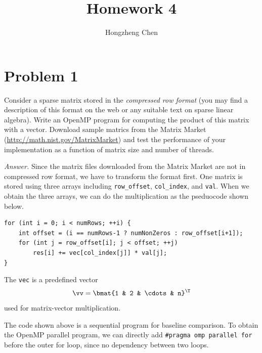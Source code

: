 \documentclass[english]{thesis}
\title{Homework 4}
\author{Hongzheng Chen}
\begin{document}
\maketitle

\section{Problem 1}
Consider a sparse matrix stored in the \emph{compressed row format} (you may find a description of this format on the web or any suitable text on sparse linear algebra). Write an OpenMP program for computing the product of this matrix with a vector. Download sample matrics from the Matrix Market (\url{http://math.nist.gov/MatrixMarket}) and test the performance of your implementation as a function of matrix size and number of threads.

\bigskip

\textit{Answer.}
Since the matrix files downloaded from the Matrix Market are not in compressed row format, we have to transform the format first.
One matrix is stored using three arrays including \verb'row_offset', \verb'col_index', and \verb'val'.
When we obtain the three arrays, we can do the multiplication as the pseduocode shown below.
\begin{lstlisting}
for (int i = 0; i < numRows; ++i) {
	int offset = (i == numRows-1 ? numNonZeros : row_offset[i+1]);
	for (int j = row_offset[i]; j < offset; ++j)
		res[i] += vec[col_index[j]] * val[j];
}
\end{lstlisting}

The \verb'vec' is a predefined vector
\[\vv=\bmat{1 & 2 & \cdots & n}^\T\]
used for matrix-vector multiplication.

The code shown above is a sequential program for baseline comparison.
To obtain the OpenMP parallel program, we can directly add \verb'#pragma omp parallel for' before the outer for loop, since no dependency between two loops.
\end{document}
